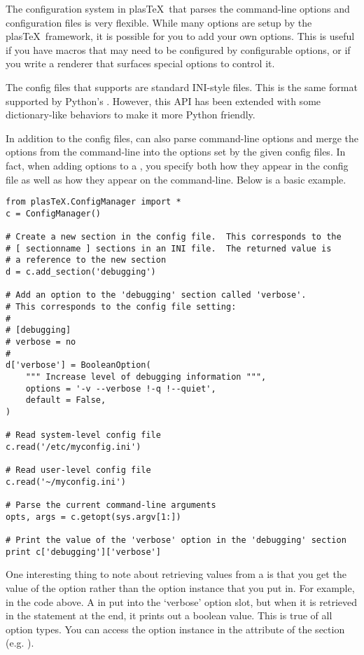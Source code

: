 \documentclass{manual}
\newcommand{\plasTeX}{plas\TeX}
\begin{document}
The configuration system in \plasTeX\ that parses the command-line options
and configuration files is very flexible.  While many options are setup
by the \plasTeX\ framework, it is possible for you to add your own options.
This is useful if you have macros that may need to be configured by 
configurable options, or if you write a renderer that surfaces special options
to control it.

The config files that  supports are standard INI-style
files.  This is the same format supported by Python's .
However, this API has been extended with some dictionary-like behaviors
to make it more Python friendly.

In addition to the config files,  can also parse
command-line options and merge the options from the command-line into
the options set by the given config files.  In fact, when adding options
to a , you specify both how they appear in the config
file as well as how they appear on the command-line.  Below is a basic 
example.

\begin{verbatim}
from plasTeX.ConfigManager import *
c = ConfigManager()

# Create a new section in the config file.  This corresponds to the
# [ sectionname ] sections in an INI file.  The returned value is 
# a reference to the new section
d = c.add_section('debugging')

# Add an option to the 'debugging' section called 'verbose'.
# This corresponds to the config file setting:
#
# [debugging]
# verbose = no
#
d['verbose'] = BooleanOption(
    """ Increase level of debugging information """,
    options = '-v --verbose !-q !--quiet',
    default = False,
)

# Read system-level config file
c.read('/etc/myconfig.ini')

# Read user-level config file
c.read('~/myconfig.ini')

# Parse the current command-line arguments
opts, args = c.getopt(sys.argv[1:])

# Print the value of the 'verbose' option in the 'debugging' section
print c['debugging']['verbose']
\end{verbatim}

One interesting thing to note about retrieving values from a 
 is that you get the value of the option
rather than the option instance that you put in.  For example, in the
code above.  A  in put into the `verbose' option
slot, but when it is retrieved in the  statement at
the end, it prints out a boolean value.  This is true of all option
types.  You can access the option instance in the  attribute
of the section (e.g. ).
\end{document}
